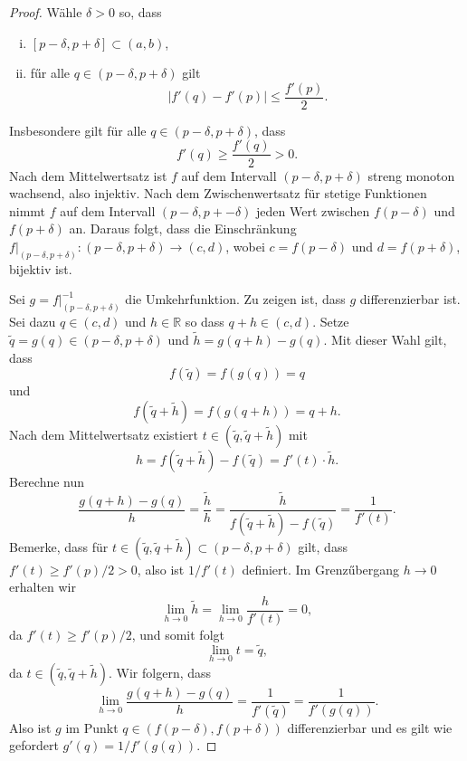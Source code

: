 \documentclass[../main.tex]{subfiles}
\begin{document}
\begin{proof}
  Wähle $\delta > 0$ so, dass
  \begin{enumerate}[(i)]
    \item $[p - \delta, p + \delta] \subset (a,b)$,
    \item fűr alle $q \in (p - \delta, p + \delta)$ gilt
      \[
        |f'(q) - f'(p)| \leq \frac{f'(p)}{2}.
      \]
  \end{enumerate}
  Insbesondere gilt für alle $q \in (p - \delta, p + \delta)$, dass
  \[
    f'(q) \geq \frac{f'(q)}{2} > 0.
  \]
  Nach dem Mittelwertsatz ist $f$ auf dem
  Intervall $(p -\delta, p+\delta)$ streng
  monoton wachsend, also injektiv.
  Nach dem Zwischenwertsatz für stetige Funktionen
  nimmt $f$ auf dem Intervall $(p - \delta, p + -\delta)$ 
  jeden Wert zwischen $f(p - \delta)$ und $f(p + \delta)$ an.
  Daraus folgt, dass die Einschränkung
  $f|_{(p - \delta, p + \delta)} \colon (p - \delta, p + \delta) \to (c, d)$,
  wobei
  $c = f(p - \delta)$ und $d = f(p + \delta)$,
  bijektiv ist.

  Sei $g = f|_{(p - \delta, p + \delta)}^{-1}$ die
  Umkehrfunktion.
  Zu zeigen ist, dass $g$ differenzierbar ist.
  Sei dazu $q \in (c, d)$ und $h \in \mathbb{R}$ so dass
  $q + h \in (c, d)$. 
  Setze $\tilde q = g(q) \in (p - \delta, p +\delta)$ und
  $\tilde h = g(q + h) - g(q)$.
  Mit dieser Wahl gilt, dass
  \[
    f(\tilde q) = f(g(q)) = q
  \]
  und
  \[
    f(\tilde q + \tilde h) = f(g(q + h)) = q + h.
  \]
  Nach dem Mittelwertsatz existiert $t \in (\tilde q, \tilde q + \tilde h)$ 
  mit
  \[
    h = f(\tilde q + \tilde h) - f(\tilde q) = f'(t) \cdot \tilde h.
  \]
  Berechne nun
  \[
    \frac{g(q + h) - g(q)}{h} = \frac{\tilde h}{h} =
    \frac{\tilde h}{f(\tilde q + \tilde h) - f(\tilde q) } =
    \frac{1}{f'(t)}.
  \]
  Bemerke, dass für $t \in (\tilde q, \tilde q + \tilde h) \subset (p - \delta, p + \delta)$ 
  gilt, dass
  $f'(t) \geq f'(p) / 2 > 0$, also ist $1/f'(t)$ definiert.
  Im Grenzűbergang $h \to 0$ erhalten wir
  \[
    \lim_{h \to 0} \tilde h = \lim_{h \to 0} \frac{h}{f'(t)} = 0,
  \]
  da $f'(t) \geq f'(p) / 2$, und somit folgt
  \[
    \lim_{h \to 0} t = \tilde q,
  \]
  da $t \in (\tilde q, \tilde q + \tilde h)$. Wir folgern,
  dass
  \[
    \lim_{h \to 0} \frac{g(q + h) - g(q)}{h} = \frac{1}{f'(\tilde q)} = \frac{1}{f'(g(q))}.
  \]
  Also ist $g$ im Punkt $q \in (f(p - \delta), f(p + \delta))$ differenzierbar
  und es gilt wie gefordert $g'(q) = 1 / f'(g(q))$.
\end{proof}
\end{document}
